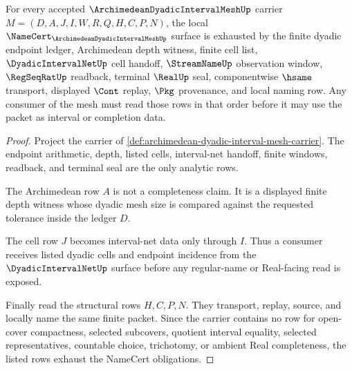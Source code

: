 \begin{theorem}
\label{thm:archimedean-dyadic-interval-mesh-namecert-obligations}
For every accepted $\ArchimedeanDyadicIntervalMeshUp$ carrier $M=(D,A,J,I,W,R,Q,H,C,P,N)$, the local $\NameCert_{\ArchimedeanDyadicIntervalMeshUp}$ surface is exhausted by the finite dyadic endpoint ledger, Archimedean depth witness, finite cell list, $\DyadicIntervalNetUp$ cell handoff, $\StreamNameUp$ observation window, $\RegSeqRatUp$ readback, terminal $\RealUp$ seal, componentwise $\hsame$ transport, displayed $\Cont$ replay, $\Pkg$ provenance, and local naming row. Any consumer of the mesh must read those rows in that order before it may use the packet as interval or completion data.
\end{theorem}
\begin{proof}
Project the carrier of \autoref{def:archimedean-dyadic-interval-mesh-carrier}. The endpoint arithmetic, depth, listed cells, interval-net handoff, finite windows, readback, and terminal seal are the only analytic rows.

The Archimedean row $A$ is not a completeness claim. It is a displayed finite depth witness whose dyadic mesh size is compared against the requested tolerance inside the ledger $D$.

The cell row $J$ becomes interval-net data only through $I$. Thus a consumer receives listed dyadic cells and endpoint incidence from the $\DyadicIntervalNetUp$ surface before any regular-name or Real-facing read is exposed.

Finally read the structural rows $H,C,P,N$. They transport, replay, source, and locally name the same finite packet. Since the carrier contains no row for open-cover compactness, selected subcovers, quotient interval equality, selected representatives, countable choice, trichotomy, or ambient Real completeness, the listed rows exhaust the NameCert obligations.
\end{proof}

